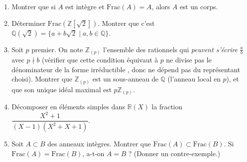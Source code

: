 \vspace{6pt}
\exolabel

\begin{mdframed}[style=exobar]
  \begin{enumerate}
    \item Montrer que si $A$ est intègre et $\mathrm{Frac}(A) = A$,
          alors $A$ est un corps.

    \item Déterminer $\mathrm{Frac}(\mathbb{Z}[\sqrt{2}])$.
          Montrer que c'est $\mathbb{Q}(\sqrt{2}) = \{a+b\sqrt{2}\mid a,b\in\mathbb{Q}\}$.

    \item Soit $p$ premier. On note $\mathbb{Z}_{(p)}$ l'ensemble des rationnels
          qui \emph{peuvent s'écrire} $\tfrac{a}{b}$ avec $p\nmid b$
          (vérifier que cette condition équivaut à \og $p$ ne divise pas le
          dénominateur de la forme irréductible \fg{}, donc ne dépend pas du
          représentant choisi). Montrer que $\mathbb{Z}_{(p)}$ est un sous-anneau
          de $\mathbb{Q}$ (l'anneau local en $p$), et que son
          unique idéal maximal est $p\mathbb{Z}_{(p)}$.

    \item Décomposer en éléments simples dans $\mathbb{R}(X)$ la fraction
          $\dfrac{X^2+1}{(X-1)(X^2+X+1)}$.

    \item Soit $A \subset B$ des anneaux intègres.
          Montrer que $\mathrm{Frac}(A) \subset \mathrm{Frac}(B)$.
          Si $\mathrm{Frac}(A) = \mathrm{Frac}(B)$, a-t-on $A = B$ ?
          (Donner un contre-exemple.)
  \end{enumerate}
\end{mdframed}

